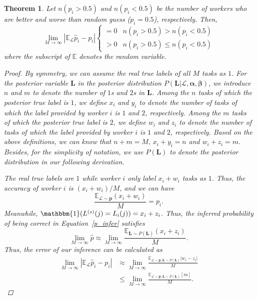 \documentclass{article}
\newtheorem{theorem}{Theorem}
\begin{document}
\begin{theorem}
\label{Conv}
Let $n(p_i>0.5)$ and $n(p_i<0.5)$ be the number of workers who are better and worse than random guess ($p_i=0.5$), respectively. Then,
\begin{equation*}
    \lim_{M\rightarrow \infty} |\mathbb{E}_{\mathcal{L}}\hat{p}_i-p_i|
    \left\{
    \begin{array}{ll}
    =0 & n(p_i>0.5)>n(p_i<0.5)\\
    >0 & n(p_i>0.5)\leq n(p_i<0.5)
    \end{array}
    \right.
\end{equation*}
where the subscript of $\mathbb{E}$ denotes the random variable.
\begin{proof}
By symmetry, we can assume the real true labels of all $M$ tasks as $1$.
For the posterior variable $\bm{L}$ in the posterior distribution $P(\bm{L}|\mathcal{L},\bm{\alpha}, \bm{\beta})$, we introduce $n$ and $m$ to denote the number of $1$s and $2$s in $\bm{L}$.
Among the $n$ tasks of which the posterior true label is $1$, we define $x_i$ and $y_i$ to denote the number of tasks of which the label provided by worker $i$ is $1$ and $2$, respectively.
Among the $m$ tasks of which the posterior true label is $2$, we define $w_i$ and $z_i$ to denote the number of tasks of which the label provided by worker $i$ is $1$ and $2$, respectively.
Based on the above definitions, we can know that $n+m=M$, $x_i+y_i=n$ and $w_i+z_i=m$.
Besides, for the simplicity of notation, we use $P(\bm{L})$ to denote the posterior distribution in our following derivation.

The real true labels are $1$ while worker $i$ only label $x_i+w_i$ tasks as $1$. Thus, the accuracy of worker $i$ is $(x_i+w_i)/M$, and we can have
\begin{equation}
 \frac{\mathbb{E}_{\mathcal{L}\sim \bm{p}}(x_i+w_i)}{M}= p_i.
\end{equation}
Meanwhile, $\mathbbm{1}(L^{(s)}(j)=L_{i}(j))=x_i+z_i$. Thus, the inferred probability of being correct in Equation~\ref{p_infer} satisfies
\begin{equation}
{\lim}_{M\rightarrow \infty}\hat{p} \approx {\lim}_{M\rightarrow \infty} \frac{\mathbb{E}_{\bm{L}\sim P(\bm{L})}(x_i+z_i)}{M}.
\end{equation}
Thus, the error of our inference can be calculated as
\begin{equation}
\label{ErrorBound}
\begin{split}
  \lim_{M\rightarrow \infty} |\mathbb{E}_{\mathcal{L}}\hat{p}_i-p_i|&\approx \lim_{M\rightarrow \infty} \frac{\mathbb{E}_{\mathcal{L}\sim \bm{p},\bm{L}\sim P(\bm{L})}|w_i-z_i|}{M}\\
  &\leq\lim_{M\rightarrow \infty} \frac{\mathbb{E}_{\mathcal{L}\sim \bm{p},\bm{L}\sim P(\bm{L})}[m]}{M}.
  \end{split}
\end{equation}


\end{proof}
\end{theorem}
\end{document}
